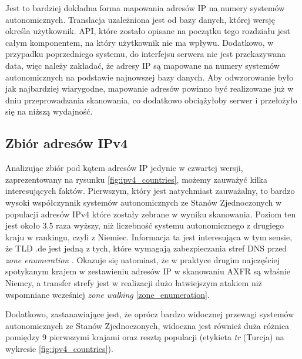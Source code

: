 Jest to bardziej dokładna forma mapowania adresów IP na numery
systemów autonomicznych. Translacja uzależniona jest od bazy danych, której wersję określa użytkownik. API, które zostało opisane
na początku tego rozdziału jest całym komponentem, na który użytkownik nie ma wpływu. Dodatkowo, w przypadku poprzedniego systemu,
do interfejsu serwera nie jest przekazywana data, więc należy zakładać, że adresy IP są mapowane na numery systemów autonomicznych
na podstawie najnowszej bazy danych. Aby odwzorowanie było jak najbardziej wiarygodne, mapowanie adresów powinno być realizowane
już w dniu przeprowadzania skanowania, co dodatkowo obciążyłoby serwer i przełożyło się na niższą wydajność.

\subsection{Zbiór adresów IPv4}
\label{sec:ipv4_results}
\noindent Analizując zbiór pod kątem adresów IP jedynie w czwartej wersji, zaprezentowany na rysunku \ref{fig:ipv4_countries}, możemy
zauważyć kilka interesujących faktów. Pierwszym, który jest natychmiast zauważalny, to bardzo wysoki współczynnik systemów autonomicznych
ze Stanów Zjednoczonych w populacji adresów IPv4 które zostały zebrane w wyniku skanowania. Poziom ten jest około 3.5 raza wyższy,
niż liczebność systemu autonomicznego z drugiego kraju w rankingu, czyli z Niemiec. Informacja ta jest interesująca w tym sensie, że
TLD .de jest jedną z tych, które wymagają zabezpieczania stref DNS przed \textit{zone enumeration} \cite{euLaw, zoneEnumeration}.
Okazuje się natomiast,
że w praktyce drugim najczęściej spotykanym krajem w zestawieniu adresów IP w skanowaniu AXFR są właśnie Niemcy, a transfer strefy
jest w realizacji dużo łatwiejszym atakiem niż wspomniane wcześniej \textit{zone walking} \ref{zone_enumeration}.

Dodatkowo, zastanawiające jest, że oprócz bardzo widocznej przewagi systemów autonomicznych ze Stanów Zjednoczonych, widoczna jest
również duża różnica pomiędzy 9 pierwszymi krajami oraz resztą populacji (etykieta \textit{tr} (Turcja) na
wykresie \ref{fig:ipv4_countries}).

